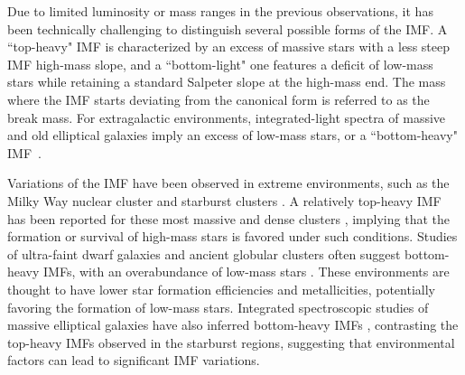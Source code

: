 \documentclass[12pt]{ucsddissertation}
\begin{document}
\begin{CJK*}{UTF8}{gbsn}
Due to limited luminosity or mass ranges in the previous observations, it has been technically challenging to distinguish several possible forms of the IMF. A ``top-heavy" IMF is characterized by an excess of massive stars with a less steep IMF high-mass slope, and a ``bottom-light" one features a deficit of low-mass stars while retaining a standard Salpeter slope at the high-mass end. The mass where the IMF starts deviating from the canonical form is referred to as the break mass. For extragalactic environments, integrated-light spectra of massive and old elliptical galaxies imply an excess of low-mass stars, or a ``bottom-heavy" IMF~\cite{vanDokkum-2010, Treu-2010, Cappellari-2012, MartinNavarro-2015}. 

Variations of the IMF have been observed in extreme environments, such as the Milky Way nuclear cluster \citep[][]{Lu-2013} and starburst clusters \citep[e.g.,][]{Schneider-2018, Hosek-2019}. A relatively top-heavy IMF has been reported for these most massive and dense clusters \citep[][]{Lim-2013, Pang-2022}, implying that the formation or survival of high-mass stars is favored under such conditions. Studies of ultra-faint dwarf galaxies and ancient globular clusters often suggest bottom-heavy IMFs, with an overabundance of low-mass stars \citep[][]{Geha-2013, Gennaro-2018}. These environments are thought to have lower star formation efficiencies and metallicities, potentially favoring the formation of low-mass stars. Integrated spectroscopic studies of massive elliptical galaxies have also inferred bottom-heavy IMFs \citep[][]{vanDokkum-2010, Conroy-2012}, contrasting the top-heavy IMFs observed in the starburst regions, suggesting that environmental factors can lead to significant IMF variations.


\end{CJK*}
\end{document}
